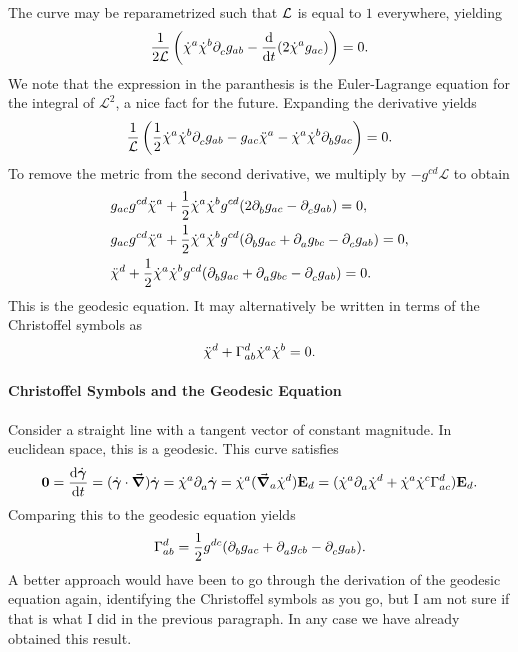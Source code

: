 The curve may be reparametrized such that $\mathcal{L}$ is equal to $1$ everywhere, yielding
\begin{align*}
	\frac{1}{2\mathcal{L}}\left(\dot{\chi}^{a}\dot{\chi}^{b}\partial^{}_{c}g_{ab} - \dv{t}(2\dot{\chi}^{a}g_{ac})\right) = 0.
\end{align*}
We note that the expression in the paranthesis is the Euler-Lagrange equation for the integral of $\mathcal{L}^{2}$, a nice fact for the future. Expanding the derivative yields
\begin{align*}
	\frac{1}{\mathcal{L}}\left(\frac{1}{2}\dot{\chi}^{a}\dot{\chi}^{b}\partial^{}_{c}g_{ab} - g_{ac}\ddot{\chi}^{a} - \dot{\chi}^{a}\dot{\chi}^{b}\partial^{}_{b}g_{ac}\right) = 0.
\end{align*}
To remove the metric from the second derivative, we multiply by $-g^{cd}\mathcal{L}$ to obtain
\begin{align*}
	&g_{ac}g^{cd}\ddot{\chi}^{a} + \frac{1}{2}\dot{\chi}^{a}\dot{\chi}^{b}g^{cd}(2\partial^{}_{b}g_{ac} - \partial^{}_{c}g_{ab}) = 0, \\
	&g_{ac}g^{cd}\ddot{\chi}^{a} + \frac{1}{2}\dot{\chi}^{a}\dot{\chi}^{b}g^{cd}(\partial^{}_{b}g_{ac} + \partial^{}_{a}g_{bc} - \partial^{}_{c}g_{ab}) = 0, \\
	&\ddot{\chi}^{d} + \frac{1}{2}\dot{\chi}^{a}\dot{\chi}^{b}g^{cd}(\partial^{}_{b}g_{ac} + \partial^{}_{a}g_{bc} - \partial^{}_{c}g_{ab}) = 0.
\end{align*}
This is the geodesic equation. It may alternatively be written in terms of the Christoffel symbols as
\begin{align*}
	\ddot{\chi}^{d} + \chris{d}{a}{b}\dot{\chi}^{a}\dot{\chi}^{b} = 0.
\end{align*}

\paragraph{Christoffel Symbols and the Geodesic Equation}
Consider a straight line with a tangent vector of constant magnitude. In euclidean space, this is a geodesic. This curve satisfies
\begin{align*}
	\vb{0} = \dv{\dot{\vb*{\gamma}}}{t} = (\dot{\vb*{\gamma}}\cdot\grad)\dot{\vb*{\gamma}} = \dot{\chi}^{a}\del{a}{\dot{\vb*{\gamma}}} = \dot{\chi}^{a}(\dcov{a}{\dot{\chi}^{d}})\tb{d} = (\dot{\chi}^{a}\del{a}{\dot{\chi}^{d}} + \dot{\chi}^{a}\dot{\chi}^{c}\chris{d}{a}{c})\tb{d}.
\end{align*}
Comparing this to the geodesic equation yields
\begin{align*}
	\chris{d}{a}{b} = \frac{1}{2}g^{dc}(\del{b}{g_{ac}} + \del{a}{g_{cb}} - \del{c}{g_{ab}}).
\end{align*}
A better approach would have been to go through the derivation of the geodesic equation again, identifying the Christoffel symbols as you go, but I am not sure if that is what I did in the previous paragraph. In any case we have already obtained this result.
